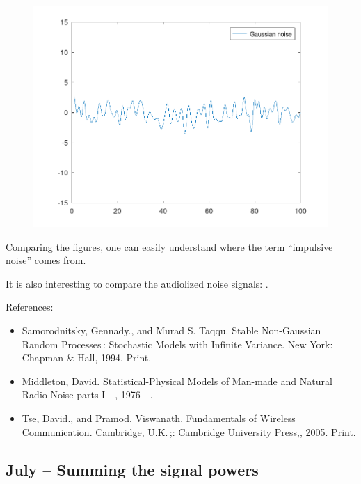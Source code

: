 \documentclass{article}
\begin{document}
\begin{figure}
  \includegraphics[width=\linewidth]{gaussiannoise.png}
\end{figure}

Comparing the figures, one can easily understand where the term ``impulsive noise'' comes from.


It is also interesting to compare the audiolized noise signals:
.



References:
\begin{itemize}
\item Samorodnitsky, Gennady., and Murad S. Taqqu. Stable Non-Gaussian Random Processes : Stochastic Models with Infinite Variance. New York: Chapman & Hall, 1994. Print.
\item Middleton, David. Statistical-Physical Models of Man-made and Natural Radio Noise parts I - , 1976 - .
\item 
  Tse, David., and Pramod. Viswanath. Fundamentals of Wireless Communication. Cambridge, U.K. ;: Cambridge University Press,, 2005. Print.
\end{itemize}




\subsection{July – Summing the signal powers}
\end{document}
